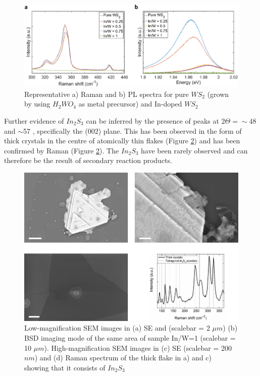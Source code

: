 \begin{figure}[H]
	\begin{center}
		\includegraphics[scale=0.5]{In/RamanPL.png}
		\caption{Representative a) Raman and b) PL spectra for pure $WS_2$ (grown by using $H_2WO_4$ as metal precursor) and In-doped $WS_2$}
		\label{fig:InRamanPL}
	\end{center}
\end{figure}

Further evidence of $In_2S_3$ can be inferred by the presence of peaks at $2\Theta ={\sim}48$ and $\sim$57 \cite{Hahn1949}, specifically the (002) plane. This has been observed in the form of thick crystals in the centre of atomically thin flakes (Figure \ref{fig:InSEMCentre}) and has been confirmed by Raman (Figure \ref{fig:InSEMCentre}). The $In_2S_3$ have been rarely observed and can therefore be the result of secondary reaction products.

\begin{figure}[!h]
	\begin{center}
		\includegraphics[scale=0.5]{In/SEMCentre.png}
		\caption{Low-magnification SEM images in (a) SE and (scalebar = 2 $\mu m$) (b) BSD imaging mode of the same area of sample In/W=1 (scalebar = 10 $\mu m$). High-magnification SEM images in (c) SE (scalebar = 200 $nm$) and (d) Raman spectrum of the thick flake in a) and c) showing that it consists of $In_2S_3$}
		\label{fig:InSEMCentre}
	\end{center}
\end{figure}

